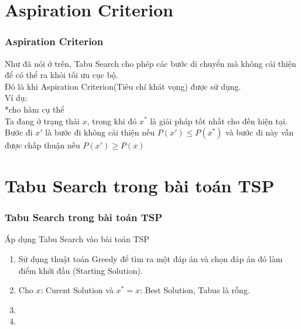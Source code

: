 \documentclass[12pt]{beamer}
\begin{document}
	\section{Aspiration Criterion}
	\begin{frame}
		\frametitle{Aspiration Criterion}
		Như đã nói ở trên, Tabu Search cho phép các bước di chuyển mà không cải thiện để có thể ra khỏi tối ưu cục bộ.\\
		Đó là khi Aspiration Criterion(Tiêu chí khát vọng) được sử dụng.\\
		Ví dụ:\\
		*cho hàm cụ thể\\
		Ta đang ở trạng thái $x$, trong khi đó $x^*$ là giải pháp tốt nhất cho đến hiện tại.\\
		Bước đi $x'$ là bước đi không cải thiện nếu $P(x') \le P(x^*)$ và bước đi này vẫn được chấp thuận nếu $P(x') \ge P(x)$
	\end{frame}

	\section{Tabu Search trong bài toán TSP}
	\begin{frame}
		\frametitle{Tabu Search trong bài toán TSP}
			
		Áp dụng Tabu Search vào bài toán TSP\\
		\begin{enumerate}[Bước 1:]
			\item Sử dụng thuật toán Greedy để tìm ra một đáp án và chọn đáp án đó làm điểm khởi đầu (Starting Solution).
			\item Cho $x$: Curent Solution và $x^* = x$: Best Solution, Tabus là rỗng.
			\item
			\item
		\end{enumerate}
	\end{frame}
\end{document}
